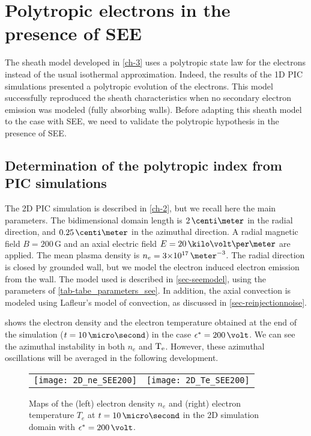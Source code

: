 

\section{Polytropic electrons in the presence of \acs{SEE}}
\label{sec-PIC_poly}

The sheath model developed in \cref{ch-3} uses a polytropic state law for the electrons instead of the usual isothermal approximation.
Indeed, the results of the  \ac{1D} \ac{PIC} simulations presented a polytropic evolution of the electrons.
This model successfully reproduced the sheath characteristics  when no secondary electron emission was modeled (fully absorbing walls).
Before adapting this sheath model to the case with \ac{SEE}, we need to validate the polytropic hypothesis in the presence of \ac{SEE}.


\subsection{Determination of the polytropic index from PIC simulations} \label{subsec-fluid_see_polyfit}


The \ac{2D} \ac{PIC} simulation is described in \cref{ch-2}, but we recall here the main parameters.
The bidimensional domain length is $2\,\centi\meter$ in the radial direction, and $0.25\,\centi\meter$ in the azimuthal direction.
A radial magnetic field $B=200\,$G and an axial electric field $E=20\,\kilo\volt\per\meter$ are applied.
The mean plasma density is $n_e = \sn{3}{17}\,\meter^{-3}$.
The radial direction is closed by grounded wall, but we model the electron induced electron emission from the wall.
The model used is described in \cref{sec-seemodel}, using the parameters of \cref{tab-tabe_parameters_see}.
In addition, the axial convection is modeled using Lafleur's model of convection, as discussed in \cref{sec-reinjectionnoise}.

 shows the electron density and the electron temperature obtained at the end of the simulation ($t=10\,\micro\second$) in the case $\crover=200\,\volt$.
We can see the azimuthal instability in both $n_e$ and $\mathrm{T_e}$.
However, these azimuthal oscillations will be averaged in the following development. 


\begin{figure}[!htb]
  \centering
  \begin{tabular}{@{} c c}
    \texttt{[image: 2D\_ne\_SEE200]} &
    \texttt{[image: 2D\_Te\_SEE200]} \\
  \end{tabular}
  \caption{Maps of the (left) electron density $n_e$ and (right) electron temperature $T_e$ at $t=10\,\micro\second$ in the \acs{2D} simulation domain with $\crover=200\,\volt$.}
  \label{fig-2DneTe}
\end{figure}



